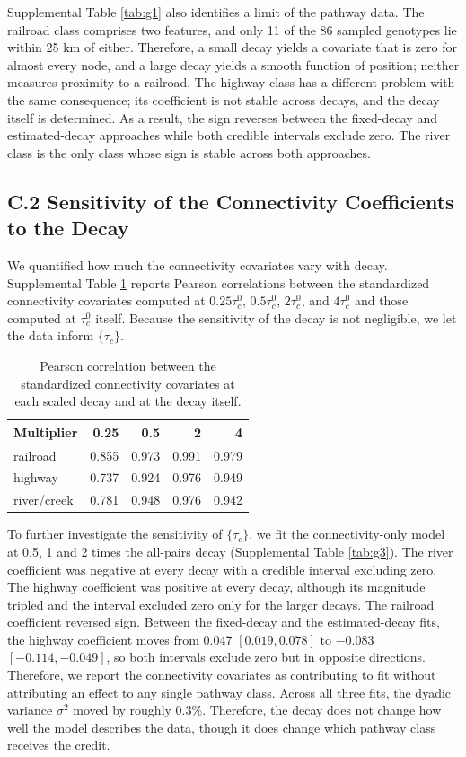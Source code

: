 \documentclass{article}
\begin{document}
 
Supplemental Table \ref{tab:g1} also identifies a limit of the pathway data. The railroad class comprises two features, and only 11 of the 86 sampled genotypes lie within 25 km of either. Therefore, a small decay yields a covariate that is zero for almost every node, and a large decay yields a smooth function of position; neither measures proximity to a railroad. The highway class has a different problem with the same consequence; its coefficient is not stable across decays, and the decay itself is determined. As a result, the sign reverses between the fixed-decay and estimated-decay approaches while both credible intervals exclude zero. The river class is the only class whose sign is stable across both approaches.
 
\subsection*{C.2 Sensitivity of the Connectivity Coefficients to the Decay}
 
We quantified how much the connectivity covariates vary with decay. Supplemental Table \ref{tab:g2} reports Pearson correlations between the standardized connectivity covariates computed at $0.25\tau^0_c$, $0.5\tau^0_c$, $2\tau^0_c$, and $4\tau^0_c$ and those computed at $\tau^0_c$ itself.
Because the sensitivity of the decay is not negligible, we let the data inform $\{\tau_c\}$.
 
\begin{table}[h]
\caption{Pearson correlation between the standardized connectivity covariates at each scaled decay and at the decay itself.}
\begin{tabular}{l|rrrr}
\label{tab:g2}
Multiplier & 0.25 & 0.5 & 2 & 4 \\ \hline
railroad     & 0.855 & 0.973 & 0.991 & 0.979 \\
highway     & 0.737 & 0.924 & 0.976 & 0.949 \\
river/creek & 0.781 & 0.948 & 0.976 & 0.942
\end{tabular}
\end{table}

 
To further investigate the sensitivity of $\{\tau_c\}$, we fit the connectivity-only model at 0.5, 1 and 2 times the all-pairs decay (Supplemental Table \ref{tab:g3}). The river coefficient was negative at every decay with a credible interval excluding zero. The highway coefficient was positive at every decay, although its magnitude tripled and the interval excluded zero only for the larger decays. The railroad coefficient reversed sign.
Between the fixed-decay and the estimated-decay fits, the highway coefficient moves from 0.047 $[0.019,0.078]$ to $-0.083$ $[-0.114,-0.049]$, so both intervals exclude zero but in opposite directions. Therefore, we report the connectivity covariates as contributing to fit without attributing an effect to any single pathway class. Across all three fits, the dyadic variance $\sigma^2$ moved by roughly 0.3\%. Therefore, the decay does not change how well the model describes the data, though it does change which pathway class receives the credit.
 
\end{document}
